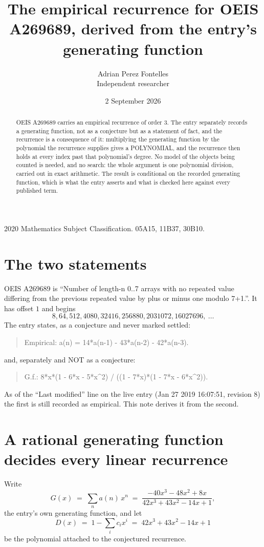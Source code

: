 \documentclass[11pt,a4paper]{article}
\title{The empirical recurrence for OEIS A269689, derived from the entry's generating function}
\author{Adrian Perez Fontelles\\ \small Independent researcher}
\date{2 September 2026}
\theoremstyle{plain}
\theoremstyle{definition}
\begin{document}
\maketitle

\begin{abstract}
OEIS A269689 carries an empirical recurrence of order $3$. The entry separately records a
generating function, not as a conjecture but as a statement of fact, and the recurrence is a
consequence of it: multiplying the generating function by the polynomial the recurrence
supplies gives a POLYNOMIAL, and the recurrence then holds at every index past that
polynomial's degree. No model of the objects being counted is needed, and no search: the
whole argument is one polynomial division, carried out in exact arithmetic. The result is
conditional on the recorded generating function, which is what the entry asserts and what is
checked here against every published term.
\end{abstract}

\noindent\small 2020 Mathematics Subject Classification. 05A15, 11B37, 30B10.\normalsize

\section{The two statements}

OEIS A269689 is ``Number of length-n 0..7 arrays with no repeated value differing from the previous repeated value by plus or minus one modulo 7+1.''. It has offset $1$ and begins
\[
8, 64, 512, 4080, 32416, 256880, 2031072, 16027696,\ \dots
\]
The entry states, as a conjecture and never marked settled:
\begin{quote}
Empirical: a(n) = 14*a(n-1) - 43*a(n-2) - 42*a(n-3).
\end{quote}
and, separately and NOT as a conjecture:
\begin{quote}
G.f.: 8*x*(1 - 6*x - 5*x\^{}2) / ((1 - 7*x)*(1 - 7*x - 6*x\^{}2)).
\end{quote}
As of the ``Last modified'' line on the live entry (Jan 27 2019 16:07:51, revision 8) the first is still
recorded as empirical. This note derives it from the second.

\section{A rational generating function decides every linear recurrence}

Write
\[
G(x)\;=\;\sum_{n}a(n)\,x^{n}\;=\;\frac{- 40 x^{3} - 48 x^{2} + 8 x}{42 x^{3} + 43 x^{2} - 14 x + 1},
\]
the entry's own generating function, and let
\[
D(x)\;=\;1-\sum_i c_i x^{i}\;=\;42 x^{3} + 43 x^{2} - 14 x + 1
\]
be the polynomial attached to the conjectured recurrence.
\end{document}
